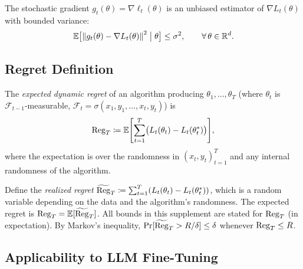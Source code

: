 \begin{assumption}
\label{ass:noise}
The stochastic gradient $g_t(\theta) = \nabla \ell_t(\theta)$ is an
unbiased estimator of $\nabla L_t(\theta)$ with bounded variance:
\[
  \mathbb{E}\bigl[\left\|g_t(\theta) - \nabla L_t(\theta)\right\|^2 \bigm| \theta\bigr]
  \leq \sigma^2, \qquad \forall\, \theta \in \mathbb{R}^d.
\]
\end{assumption}

\subsection{Regret Definition}

\begin{definition}
\label{def:regret}
The \emph{expected dynamic regret} of an algorithm producing
$\theta_1, \ldots, \theta_T$ (where $\theta_t$ is $\mathcal{F}_{t-1}$-measurable,
$\mathcal{F}_t = \sigma(x_1,y_1,\ldots,x_t,y_t)$) is
\[
  \mathrm{Reg}_T \coloneqq \mathbb{E}\Biggl[\sum_{t=1}^T
    \bigl(L_t(\theta_t) - L_t(\theta^*_t)\bigr)\Biggr],
\]
where the expectation is over the randomness in $(x_t, y_t)_{t=1}^T$
and any internal randomness of the algorithm.
\end{definition}

\begin{remark}
\label{rem:prob-mode}
Define the \emph{realized regret} $\widetilde{\mathrm{Reg}}_T \coloneqq
\sum_{t=1}^T (L_t(\theta_t) - L_t(\theta^*_t))$, which is a random
variable depending on the data and the algorithm's randomness.
The expected regret is $\mathrm{Reg}_T = \mathbb{E}[\widetilde{\mathrm{Reg}}_T]$.
All bounds in this supplement are stated for $\mathrm{Reg}_T$ (in expectation).
By Markov's inequality, $\Pr[\widetilde{\mathrm{Reg}}_T > R/\delta] \leq \delta$
whenever $\mathrm{Reg}_T \leq R$.
\end{remark}

\subsection{Applicability to LLM Fine-Tuning}

